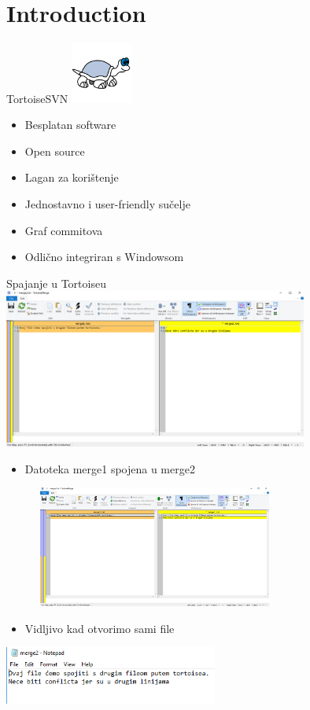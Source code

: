 \documentclass{beamer}
\begin{document}
\maketitle

\section{Introduction}
\begin{frame}{TortoiseSVN}
\includegraphics[width=2cm, height=2cm]{tortoise4.png}
\begin{itemize}
    \item Besplatan software
    \item Open source
    \item Lagan za korištenje
    \item Jednostavno i user-friendly sučelje
    \item Graf commitova
    \item Odlično integriran s Windowsom
    
    
\end{itemize}
    
\end{frame}
\begin{frame}{Spajanje u Tortoiseu}
\includegraphics[width=10cm]{tortoise1.png}
\end{frame}
\begin{frame}
\begin{itemize}
    \item\small{Datoteka merge1 spojena u merge2}
\end{itemize}
\includegraphics[height=4cm, width=10cm]{tortoise2.png}\newline
\begin{itemize}
    \item\small{Vidljivo kad otvorimo sami file}
\end{itemize}
\includegraphics[width=7cm]{tortoise3.png}
\end{frame}
\end{document}
